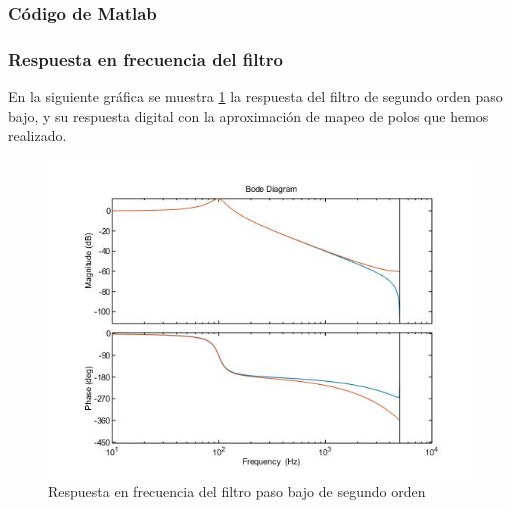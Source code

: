 \documentclass[titlepage]{article}
\begin{document}
\subsubsection{Código de Matlab}

\subsubsection{Respuesta en frecuencia del filtro}
En la siguiente gráfica se muestra \ref{fig:lowpassdiscrete} la respuesta del filtro de segundo orden paso bajo, y su respuesta digital con la aproximación de mapeo de polos que hemos realizado. 
\begin{figure}[H]
  \centering
	\includegraphics[scale=0.5]{lowpassdiscrete}
  \caption{Respuesta en frecuencia del filtro paso bajo de segundo orden}
  \label{fig:lowpassdiscrete}
\end{figure}
\end{document}
